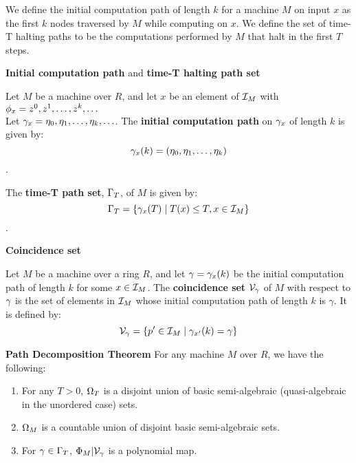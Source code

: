  We define the initial computation path of length $k$ for a machine
  $M$ on input $x$ as the first $k$ nodes traversed by $M$ while
  computing on $x$.  We define the set of time-T halting paths to be the
  computations performed by $M$ that halt in the first $T$ steps.

  \begin{definition}{\textbf{Initial computation path} and \textbf{time-T halting path set}}

    Let $M$ be a machine over $R$, and let $x$ be an element of
    $\mathcal{I}_M$ with $\phi_x = z^0, z^1, \ldots, z^k, \ldots$ \\
    Let $\gamma_x = \eta_0, \eta_1, \ldots, \eta_k, \ldots$.  
    The \textbf{initial computation path} on $\gamma_x$ of
    length $k$ is given by: 
    $$\gamma_x(k) = (\eta_0, \eta_1, \ldots,\eta_k)$$.

    The \textbf{time-T path set}, $\Gamma_{T}$, of $M$ is given by:
    $$\Gamma_{T} = \{\gamma_x(T) \mid T(x) \leq T, x \in \mathcal{I}_M\}$$.

  \end{definition}
  
  \begin{definition}{\textbf{Coincidence set}}

    Let $M$ be a machine over a ring $R$, and let $\gamma =
    \gamma_{x}(k)$ be the initial computation path of length $k$
    for some $x \in \mathcal{I}_M$. The \textbf{coincidence set}
    $\mathcal{V}_{\gamma}$ of $M$ with respect to $\gamma$
    is the set of elements in $\mathcal{I}_M$ whose initial computation
    path of length $k$ is $\gamma$. It is defined by:
    $$\mathcal{V}_{\gamma} = 
    \{p' \in \mathcal{I}_M \mid \gamma_{x'}(k) = \gamma\}$$
    
    \emph{}

  \end{definition}

  \begin{theorem}{\textbf{Path Decomposition Theorem}}
    For any machine $M$ over $R$, we have the following:

    \begin{enumerate}
    \item For any $T > 0$, $\Omega_T$ is a disjoint union of basic
      semi-algebraic (quasi-algebraic in the unordered case) sets.

    \item $\Omega_M$ is a countable union of disjoint basic
      semi-algebraic sets.

    \item For $\gamma \in \Gamma_{T}$,
      $\Phi_M|\mathcal{V}_{\gamma}$ is a polynomial map.
    \end{enumerate}
  \end{theorem}

